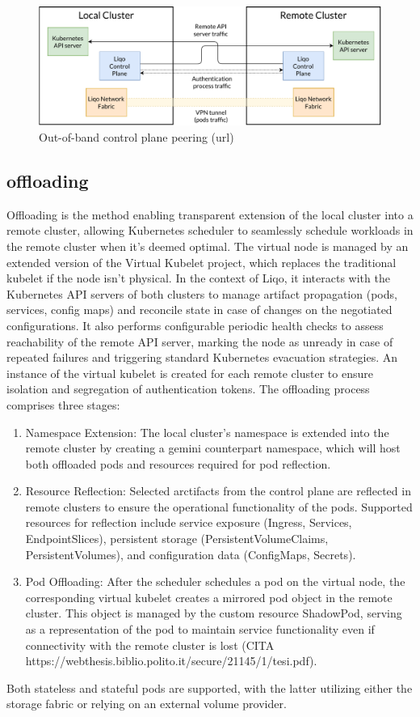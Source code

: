 \begin{figure}[htb]\centering
\includegraphics[scale=.5] {Pictures/out-of-band}
\caption{Out-of-band control plane peering (url)}\label{fig:figura}
\end{figure}

\subsection{offloading}
Offloading is the method enabling transparent extension of the local cluster into a remote cluster, allowing Kubernetes scheduler to seamlessly schedule workloads in the remote cluster when it's deemed optimal. The virtual node is managed by an extended version of the Virtual Kubelet project, which replaces the traditional kubelet if the node isn't physical. In the context of Liqo, it interacts with the Kubernetes API servers of both clusters to manage artifact propagation (pods, services, config maps) and reconcile state in case of changes on the negotiated configurations. It also performs configurable periodic health checks to assess reachability of the remote API server, marking the node as unready in case of repeated failures and triggering standard Kubernetes evacuation strategies. An instance of the virtual kubelet is created for each remote cluster to ensure isolation and segregation of authentication tokens.
The offloading process comprises three stages:
\begin{enumerate}
\item Namespace Extension: The local cluster's namespace is extended into the remote cluster by creating a gemini counterpart namespace, which will host both offloaded pods and resources required for pod reflection.
\item Resource Reflection: Selected arctifacts from the control plane are reflected in remote clusters to ensure the operational functionality of the pods. Supported resources for reflection include service exposure (Ingress, Services, EndpointSlices), persistent storage (PersistentVolumeClaims, PersistentVolumes), and configuration data (ConfigMaps, Secrets).
\item Pod Offloading: After the scheduler schedules a pod on the virtual node, the corresponding virtual kubelet creates a mirrored pod object in the remote cluster. This object is managed by the custom resource ShadowPod, serving as a representation of the pod to maintain service functionality even if connectivity with the remote cluster is lost (CITA https://webthesis.biblio.polito.it/secure/21145/1/tesi.pdf).
\end{enumerate}
Both stateless and stateful pods are supported, with the latter utilizing either the storage fabric or relying on an external volume provider.

